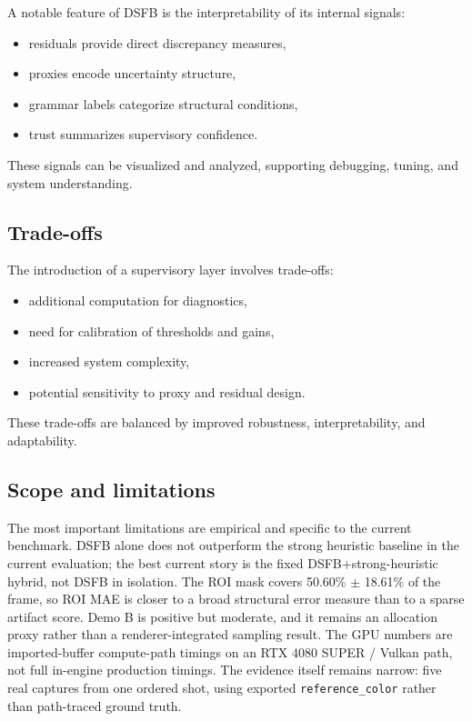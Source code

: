 \documentclass[11pt,letterpaper]{article}
\theoremstyle{gcresult}
\theoremstyle{definition}
\begin{document}
A notable feature of DSFB is the interpretability of its internal signals:

\begin{itemize}[leftmargin=1.5em]
    \item residuals provide direct discrepancy measures,
    \item proxies encode uncertainty structure,
    \item grammar labels categorize structural conditions,
    \item trust summarizes supervisory confidence.
\end{itemize}

These signals can be visualized and analyzed, supporting debugging, tuning, and system understanding.


\subsection{Trade-offs}

The introduction of a supervisory layer involves trade-offs:

\begin{itemize}[leftmargin=1.5em]
    \item additional computation for diagnostics,
    \item need for calibration of thresholds and gains,
    \item increased system complexity,
    \item potential sensitivity to proxy and residual design.
\end{itemize}

These trade-offs are balanced by improved robustness, interpretability, and adaptability.


\subsection{Scope and limitations}

The most important limitations are empirical and specific to the current benchmark. DSFB alone does not outperform the strong heuristic baseline in the current evaluation; the best current story is the fixed DSFB+strong-heuristic hybrid, not DSFB in isolation. The ROI mask covers 50.60\% $\pm$ 18.61\% of the frame, so ROI MAE is closer to a broad structural error measure than to a sparse artifact score. Demo B is positive but moderate, and it remains an allocation proxy rather than a renderer-integrated sampling result. The GPU numbers are imported-buffer compute-path timings on an RTX 4080 SUPER / Vulkan path, not full in-engine production timings. The evidence itself remains narrow: five real captures from one ordered shot, using exported \texttt{reference\_color} rather than path-traced ground truth.
\end{document}

